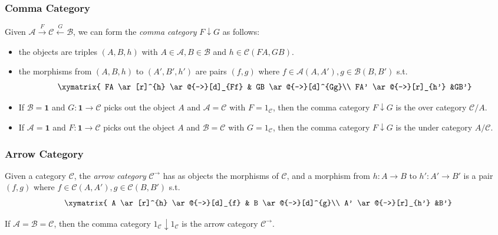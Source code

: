 \documentclass[UTF8,aspectratio=43,11pt,colorlinks,compress,openany]{beamer}%
\begin{document}
\begin{frame}\frametitle{Comma Category}
\setlength\abovedisplayskip{0pt}
\setlength\belowdisplayskip{0pt}
\begin{definition}
Given $\mathcal{A}\xrightarrow{F}\mathcal{C}\xleftarrow{G}\mathcal{B}$, we can form the \emph{comma category} $F\downarrow G$ as follows:
\begin{itemize}
	\item the objects are triples $(A,B,h)$ with $A\in\mathcal{A}, B\in\mathcal{B}$ and $h\in\mathcal{C}(FA,GB)$.
	\item the morphisms from $(A,B,h)$ to $(A',B',h')$ are pairs $(f,g)$ where $f\in\mathcal{A}(A,A'), g\in\mathcal{B}(B,B')$ s.t.
\[
\xymatrix{
FA \ar[r]^{h} \ar@{->}[d]_{Ff} & GB \ar@{->}[d]^{Gg}\\
FA' \ar@{->}[r]_{h'} &GB'}
\]
\end{itemize}
\end{definition}
\begin{itemize}
	\item If $\mathcal{B}=\mathbf{1}$ and $G:\mathbf{1}\to\mathcal{C}$ picks out the object $A$ and $\mathcal{A}=\mathcal{C}$ with $F=1_{\mathcal{C}}$, then the comma category $F\downarrow G$ is the over category $\mathcal{C}/A$.
	\item If $\mathcal{A}=\mathbf{1}$ and $F:\mathbf{1}\to\mathcal{C}$ picks out the object $A$ and $\mathcal{B}=\mathcal{C}$ with $G=1_{\mathcal{C}}$, then the comma category $F\downarrow G$ is the under category $A/\mathcal{C}$.
\end{itemize}
\end{frame}

\begin{frame}\frametitle{Arrow Category}
\begin{definition}
Given a category $\mathcal{C}$, the \emph{arrow category} $\mathcal{C}^\to$ has as objects the morphisms of $\mathcal{C}$, and a morphism from $h: A\to B$ to $h': A'\to B'$ is a pair $(f,g)$ where $f\in\mathcal{C}(A,A'), g\in\mathcal{C}(B,B')$ s.t.
\[\xymatrix{
A \ar[r]^{h} \ar@{->}[d]_{f} & B \ar@{->}[d]^{g}\\
A' \ar@{->}[r]_{h'} &B'}\]
\end{definition}
If $\mathcal{A}=\mathcal{B}=\mathcal{C}$, then the comma category $1_{\mathcal{C}}\downarrow 1_{\mathcal{C}}$ is the arrow category $\mathcal{C}^\to$.
\end{frame}
\end{document}
